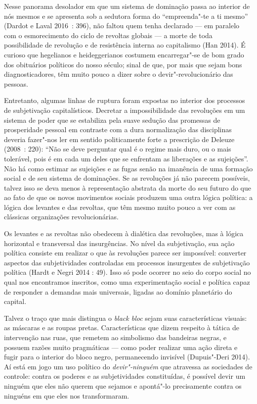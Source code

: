 Nesse panorama desolador em que um sistema de dominação passa ao
interior de nós mesmos e se apresenta sob a sedutora forma do
``empreenda"-te a ti mesmo'' (Dardot e Laval 2016~: 396), não faltou quem
tenha declarado --- em paralelo com o esmorecimento do ciclo de revoltas
globais --- a morte de toda possibilidade de revolução e de resistência
interna ao capitalismo (Han 2014). É curioso que hegelianos e
heideggerianos costumem encarregar"-se de bom grado dos obituários
políticos do nosso século; sinal de que, por mais que sejam bons
diagnosticadores, têm muito pouco a dizer sobre o devir"-revolucionário
das pessoas.

Entretanto, algumas linhas de ruptura foram expostas no interior dos
processos de subjetivação capitalísticos. Decretar a impossibilidade das
revoluções em um sistema de poder que se estabiliza pela suave sedução
das promessas de prosperidade pessoal em contraste com a dura
normalização das disciplinas deveria fazer"-nos ler em sentido
politicamente forte a prescrição de Deleuze (2008~: 220): ``Não se deve
perguntar qual é o regime mais duro, ou o mais tolerável, pois é em cada
um deles que se enfrentam as liberações e as sujeições''. Não há como
estimar as sujeições e as fugas senão na imanência de uma formação
social e de seu sistema de dominações. Se as revoluções já não parecem
possíveis, talvez isso se deva menos à representação abstrata da morte
do seu futuro do que ao fato de que os novos movimentos sociais produzem
uma outra lógica política: a lógica dos levantes e das revoltas, que têm
mesmo muito pouco a ver com as clássicas organizações revolucionárias.

Os levantes e as revoltas não obedecem à dialética das revoluções, mas à
lógica horizontal e transversal das insurgências. No nível da
subjetivação, sua ação política consiste em realizar o que às revoluções
parece ser impossível: converter aspectos das subjetividades controladas
em processos insurgentes de subjetivação política (Hardt e Negri 2014 :
49). Isso só pode ocorrer no seio do corpo social no qual nos
encontramos inscritos, como uma experimentação social e política capaz
de responder a demandas mais universais, ligadas ao domínio planetário
do capital.

Talvez o traço que mais distingua o \emph{black bloc} sejam suas
características visuais: as máscaras e as roupas pretas. Características
que dizem respeito à tática de intervenção nas ruas, que remetem ao
simbolismo das bandeiras negras, e possuem razões muito pragmáticas ---
como poder realizar uma ação direta e fugir para o interior do bloco
negro, permanecendo invisível (Dupuis"-Deri 2014). Aí está em jogo um uso
político do \emph{devir"-ninguém }que atravessa as sociedades de
controle: contra os poderes e as subjetividades constituídas, é possível
devir um ninguém que eles não querem que sejamos e apontá"-lo
precisamente contra os ninguéns em que eles nos transformaram.

